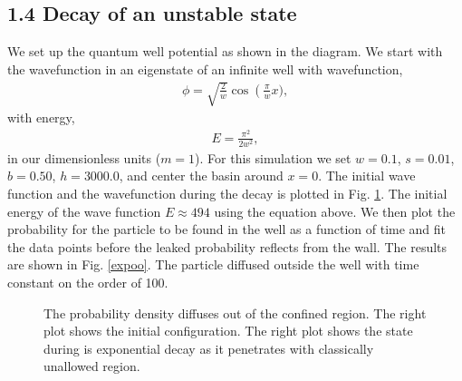 \documentclass[singlepage,notitlepage,nofootinbib,11pt]{revtex4-1}
\begin{document}
\subsection*{1.4 Decay of an unstable state}
We set up the quantum well potential as shown in the diagram. We start with the wavefunction in an eigenstate of an infinite well with wavefunction,
\begin{align*}
\phi = \sqrt{\frac{2}{w}}\cos\left(\frac{\pi}{w}x),
\end{align*}
with energy,
\begin{align*}
E = \frac{\pi^2}{2 w^2},
\end{align*}
in our dimensionless units ($m=1$). For this simulation we set $w=0.1$, $s=0.01$, $b=0.50$, $h=3000.0$, and center the basin around $x=0$. The initial wave function and the wavefunction during the decay is plotted in Fig. \ref{decaying}. The initial energy of the wave function $E\approx494$ using the equation above. We then plot the probability for the particle to be found in the well as a function of time and fit the data points before the leaked probability reflects from the wall. The results are shown in Fig. \ref{expoo}. The particle diffused outside the well with time constant on the order of 100.
\begin{figure}[h]
  \centering
  \captionsetup[subfigure]{labelformat=empty}
  \caption{\label{decaying} The probability density diffuses out of the confined region. The right plot shows the initial configuration. The right plot shows the state during is exponential decay as it penetrates with classically unallowed region.}
\end{figure}
\end{document}
